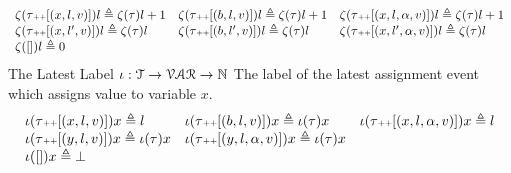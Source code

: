 \[
\begin{array}{lll}
\mathtt{\zeta}(\mathtt{\tau}  {\scriptscriptstyle ++} [(x, l, v)] ) l \triangleq \mathtt{\zeta}(\mathtt{\tau}) l + 1
&
\mathtt{\zeta}(\mathtt{\tau}  {\scriptscriptstyle ++} [(b, l, v)] ) l \triangleq \mathtt{\zeta}(\mathtt{\tau}) l + 1
&
\mathtt{\zeta}(\mathtt{\tau}  {\scriptscriptstyle ++} [(x, l, \alpha, v)] ) l \triangleq \mathtt{\zeta}(\mathtt{\tau}) l + 1
\\
\mathtt{\zeta}(\mathtt{\tau}  {\scriptscriptstyle ++} [(x, l', v)] ) l \triangleq \mathtt{\zeta}(\mathtt{\tau} ) l
&
\mathtt{\zeta}(\mathtt{\tau}  {\scriptscriptstyle ++} [(b, l', v)] ) l \triangleq \mathtt{\zeta}(\mathtt{\tau} ) l
&
\mathtt{\zeta}(\mathtt{\tau}  {\scriptscriptstyle ++} [(x, l', \alpha, v)]) l \triangleq \mathtt{\zeta}(\mathtt{\tau} ) l
\\
\mathtt{\zeta}({[]}) l \triangleq 0
&&
\end{array}
\]
%
%
 The Latest Label $\iota : \mathcal{T} \to \mathcal{VAR} \to \mathbb{N}$ 
The label of the latest assignment event which assigns value to variable $x$.
\[
  \begin{array}{lll}
\iota(\mathtt{\tau}  {\scriptscriptstyle ++} [(x, l, v)]) x \triangleq l
&
\iota(\mathtt{\tau}  {\scriptscriptstyle ++} [(b, l, v)]) x \triangleq \iota(\mathtt{\tau}) x
&
\iota(\mathtt{\tau}  {\scriptscriptstyle ++} [(x, l, \alpha, v)]) x \triangleq l
\\
\iota(\mathtt{\tau}  {\scriptscriptstyle ++} [(y, l, v)]) x \triangleq \iota(\mathtt{\tau} ) x
&
\iota(\mathtt{\tau}  {\scriptscriptstyle ++} [(y, l, \alpha, v)]) x \triangleq \iota(\mathtt{\tau} ) x
\\
\iota({[]}) x \triangleq \bot
&&
\end{array}
\]
